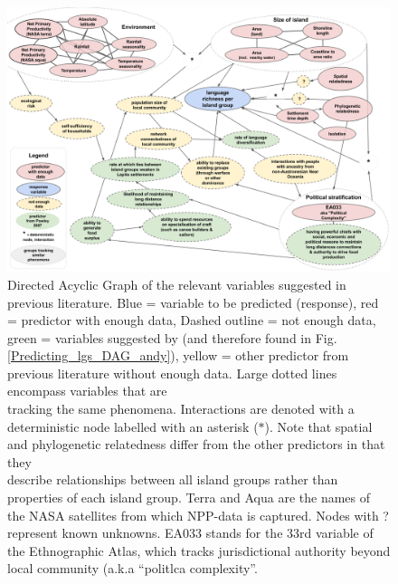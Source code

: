 \documentclass[unnumsec,webpdf,modern,medium]{oup-authoring-template}
\begin{document}
\begin{figure} 
\includegraphics[width=\textwidth]{Predicting_lgs_DAG_full}
\caption{Directed Acyclic Graph of the relevant variables suggested in previous literature. Blue = variable to be predicted (response), red = predictor with enough data, Dashed outline = not enough data,\\ green = variables suggested by \citet{pawley2007} (and therefore found in Fig. \ref{Predicting_lgs_DAG_andy}), yellow = other predictor from previous literature without enough data. Large dotted lines encompass variables that are \\tracking the same phenomena.  Interactions are denoted with a deterministic node labelled with an asterisk ($\ast$). Note that spatial and phylogenetic relatedness differ from the other predictors in that they\\ describe relationships between all island groups rather than properties of each island group. Terra and Aqua are the names of the NASA satellites from which NPP-data is captured. Nodes with ? \\represent known unknowns. EA033 stands for the 33rd variable of the Ethnographic Atlas, which tracks jurisdictional authority beyond local community (a.k.a ``politlca complexity''.}
\label{Predicting_lgs_DAG_full}
\end{figure}

\FloatBarrier

\FloatBarrier
\end{document}

